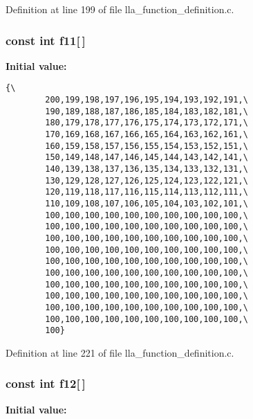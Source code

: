 Definition at line 199 of file lla\_\-function\_\-definition.c.
\subsubsection{\setlength{\rightskip}{0pt plus 5cm}const int {\bf f11}[$\,$]}\label{lla__function__definition_8c_a10}


{\bf Initial value:}

\footnotesize\begin{verbatim}{\
        200,199,198,197,196,195,194,193,192,191,\
        190,189,188,187,186,185,184,183,182,181,\
        180,179,178,177,176,175,174,173,172,171,\
        170,169,168,167,166,165,164,163,162,161,\
        160,159,158,157,156,155,154,153,152,151,\
        150,149,148,147,146,145,144,143,142,141,\
        140,139,138,137,136,135,134,133,132,131,\
        130,129,128,127,126,125,124,123,122,121,\
        120,119,118,117,116,115,114,113,112,111,\
        110,109,108,107,106,105,104,103,102,101,\
        100,100,100,100,100,100,100,100,100,100,\
        100,100,100,100,100,100,100,100,100,100,\
        100,100,100,100,100,100,100,100,100,100,\
        100,100,100,100,100,100,100,100,100,100,\
        100,100,100,100,100,100,100,100,100,100,\
        100,100,100,100,100,100,100,100,100,100,\
        100,100,100,100,100,100,100,100,100,100,\
        100,100,100,100,100,100,100,100,100,100,\
        100,100,100,100,100,100,100,100,100,100,\
        100,100,100,100,100,100,100,100,100,100,\
        100}
\end{verbatim}\normalsize 


Definition at line 221 of file lla\_\-function\_\-definition.c.
\subsubsection{\setlength{\rightskip}{0pt plus 5cm}const int {\bf f12}[$\,$]}\label{lla__function__definition_8c_a11}


{\bf Initial value:}

